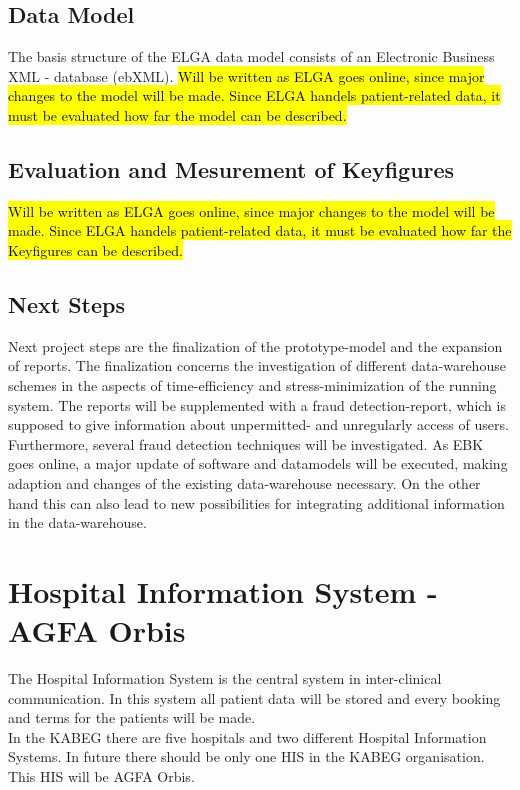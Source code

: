 \documentclass[a4paper]{article}
\begin{document}
	
	
	\subsection{Data Model}
	The basis structure of the ELGA data model consists of an Electronic Business
	XML - database (ebXML).
	\hl{Will be written as ELGA goes online, since major
	changes to the model will be made.
	Since ELGA handels patient-related data, it must be evaluated how far the model can be described.}
	\subsection{Evaluation and Mesurement of Keyfigures}
	\hl{Will be written as ELGA goes online, since major changes to the model will be made.
	Since ELGA handels patient-related data, it must be evaluated how far the Keyfigures can be described.}
	\subsection{Next Steps}
	Next project steps are the finalization of the prototype-model and the expansion
	of reports. The finalization concerns the investigation of different data-warehouse
	schemes in the aspects of time-efficiency and stress-minimization of the running system.
	The reports will be supplemented with a fraud detection-report, which is supposed to 
	give information about unpermitted- and unregularly access of users. Furthermore,
	several fraud detection techniques will be investigated. As EBK goes online, a major
	update of software and datamodels will be executed, making adaption and changes of the
	existing data-warehouse necessary. On the other hand this can also lead to new possibilities
	for integrating additional information in the data-warehouse.
	
	\newpage
	
	\section{Hospital Information System - AGFA Orbis}
	The Hospital Information System is the central system in inter-clinical
	communication. In this system all patient data will be stored and every booking
	and terms for the patients will be made.\\
	In the KABEG there are five hospitals and two different Hospital Information
	Systems. In future there should be only one HIS in the KABEG organisation. This
	HIS will be AGFA Orbis.
\end{document}

